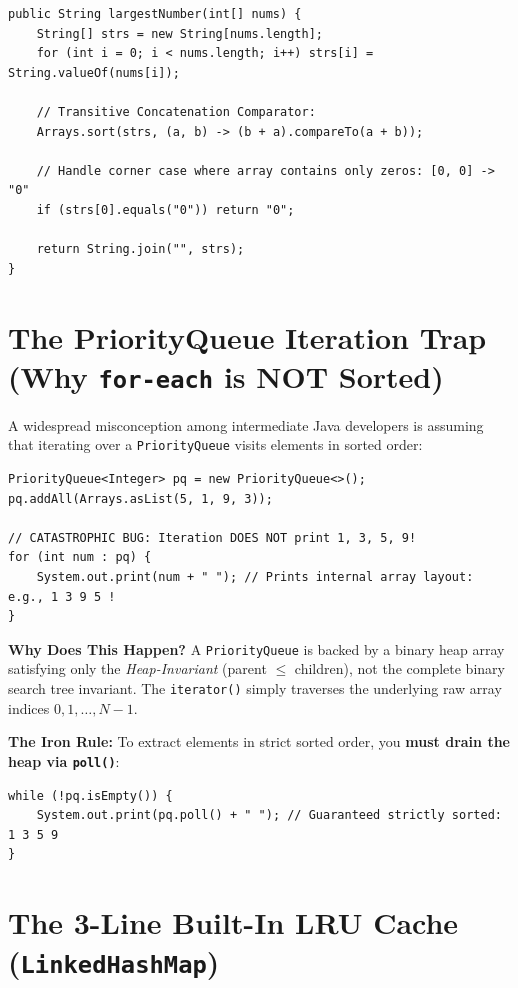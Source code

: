 \documentclass[10pt,journal,compsoc,onecolumn]{IEEEtran}
\begin{document}
\begin{verbatim}
public String largestNumber(int[] nums) {
    String[] strs = new String[nums.length];
    for (int i = 0; i < nums.length; i++) strs[i] = String.valueOf(nums[i]);

    // Transitive Concatenation Comparator:
    Arrays.sort(strs, (a, b) -> (b + a).compareTo(a + b));

    // Handle corner case where array contains only zeros: [0, 0] -> "0"
    if (strs[0].equals("0")) return "0";

    return String.join("", strs);
}
\end{verbatim}

\section{The PriorityQueue Iteration Trap (Why \texttt{for-each} is NOT Sorted)}
\label{sec:pq_iteration_trap}

A widespread misconception among intermediate Java developers is assuming that iterating over a \texttt{PriorityQueue} visits elements in sorted order:

\begin{verbatim}
PriorityQueue<Integer> pq = new PriorityQueue<>();
pq.addAll(Arrays.asList(5, 1, 9, 3));

// CATASTROPHIC BUG: Iteration DOES NOT print 1, 3, 5, 9!
for (int num : pq) {
    System.out.print(num + " "); // Prints internal array layout: e.g., 1 3 9 5 !
}
\end{verbatim}

\textbf{Why Does This Happen?}
A \texttt{PriorityQueue} is backed by a binary heap array satisfying only the \emph{Heap-Invariant} (parent $\le$ children), not the complete binary search tree invariant. The \texttt{iterator()} simply traverses the underlying raw array indices $0, 1, \dots, N-1$.

\textbf{The Iron Rule:} To extract elements in strict sorted order, you \textbf{must drain the heap via \texttt{poll()}}:
\begin{verbatim}
while (!pq.isEmpty()) {
    System.out.print(pq.poll() + " "); // Guaranteed strictly sorted: 1 3 5 9
}
\end{verbatim}

\section{The 3-Line Built-In LRU Cache (\texttt{LinkedHashMap})}
\label{sec:builtin_lru}
\end{document}
